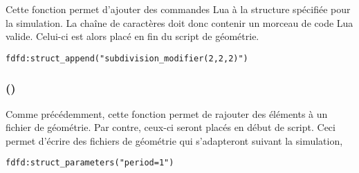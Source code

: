 \langswitch
{
	Cette fonction permet d'ajouter des commandes Lua à la structure spécifiée pour la simulation. La chaîne de caractères  doit donc contenir un morceau de code Lua valide. Celui-ci est alors placé en fin du script de géométrie.
}{
	\fwarn
}
\begin{lstlisting}
fdfd:struct_append("subdivision_modifier(2,2,2)")
\end{lstlisting}


\subsubsection[struct\_parameters]{()}

\langswitch
{
	Comme précédemment, cette fonction permet de rajouter des éléments à un fichier de géométrie. Par contre, ceux-ci seront placés en début de script. Ceci permet d'écrire des fichiers de géométrie qui s'adapteront suivant la simulation, 
}{
	\fwarn
}
\begin{lstlisting}
fdfd:struct_parameters("period=1")
\end{lstlisting}

